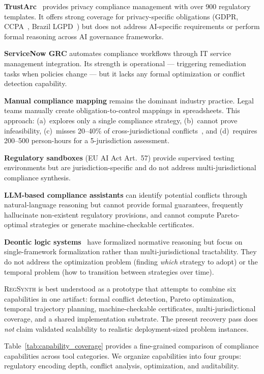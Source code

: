 \documentclass[11pt,twocolumn]{article}
\newcommand{\regsynth}{\textsc{RegSynth}}
\begin{document}
\textbf{TrustArc}~\cite{trustarc2024} provides privacy compliance management
with over 900 regulatory templates. It offers strong coverage for privacy-specific
obligations (GDPR, CCPA~\cite{ccpa2018}, Brazil LGPD~\cite{brazillgpd}) but does
not address AI-specific requirements or perform formal reasoning across AI
governance frameworks.

\textbf{ServiceNow GRC} automates compliance workflows through IT service
management integration. Its strength is operational — triggering remediation
tasks when policies change — but it lacks any formal optimization or conflict
detection capability.

\textbf{Manual compliance mapping} remains the dominant industry practice.
Legal teams manually create obligation-to-control mappings in spreadsheets.
This approach: (a)~explores only a single compliance strategy, (b)~cannot
prove infeasibility, (c)~misses 20--40\% of cross-jurisdictional
conflicts~\cite{hashmi2018compliance}, and (d)~requires 200--500 person-hours
for a 5-jurisdiction assessment.

\textbf{Regulatory sandboxes} (EU AI Act Art.~57) provide supervised testing
environments but are jurisdiction-specific and do not address multi-jurisdictional
compliance synthesis.

\textbf{LLM-based compliance assistants} can identify potential conflicts through
natural-language reasoning but cannot provide formal guarantees, frequently
hallucinate non-existent regulatory provisions, and cannot compute Pareto-optimal
strategies or generate machine-checkable certificates.

\textbf{Deontic logic systems}~\cite{vonwright1951,governatori2013compliance,sartor2005legal}
have formalized normative reasoning but focus on single-framework formalization
rather than multi-jurisdictional tractability. They do not address the optimization
problem (finding \emph{which} strategy to adopt) or the temporal problem (how to
transition between strategies over time).

\regsynth{} is best understood as a prototype that attempts to combine six capabilities in one artifact: formal conflict detection, Pareto optimization, temporal trajectory planning, machine-checkable certificates, multi-jurisdictional coverage, and a shared implementation substrate. The present recovery pass does \emph{not} claim validated scalability to realistic deployment-sized problem instances.

Table~\ref{tab:capability_coverage} provides a fine-grained comparison of
compliance capabilities across tool categories. We organize capabilities into
four groups: regulatory encoding depth, conflict analysis, optimization, and
auditability.
\end{document}
